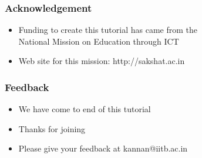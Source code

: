

\begin{frame}
\frametitle{Acknowledgement}
\begin{itemize}
\item Funding to create this tutorial has came from
  the \\ National Mission on Education through ICT
\item Web site for this mission:
  {\color{magenta} http://sakshat.ac.in}
\end{itemize}
\end{frame}

\begin{frame}
\frametitle{Feedback}
\begin{itemize}
\item We have come to end of this tutorial
\item Thanks for joining 
\item Please give your feedback at kannan@iitb.ac.in
\end{itemize}
\end{frame}
